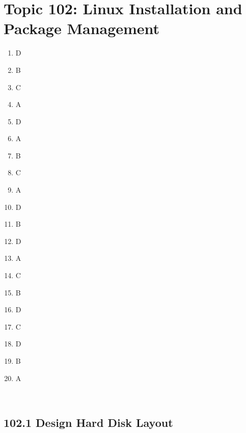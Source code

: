 \documentclass[a4paper]{report}
\begin{document}

\section*{Topic 102: Linux Installation and Package Management}
\begin{enumerate}[1.]
    \item D
    \item B
    \item C
    \item A
    \item D
    \item A
    \item B
    \item C
    \item A
    \item D
    \item B
    \item D
    \item A
    \item C
    \item B
    \item D
    \item C
    \item D
    \item B
    \item A
\end{enumerate}

\
    
\subsection*{102.1  Design Hard Disk Layout}
\end{document}
